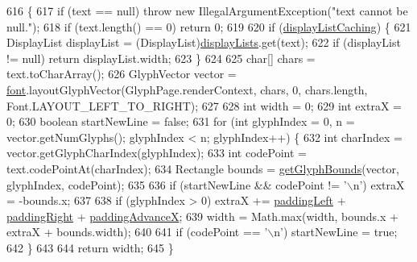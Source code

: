 \begin{DoxyCode}
616                                       \{
617         \textcolor{keywordflow}{if} (text == null) \textcolor{keywordflow}{throw} \textcolor{keyword}{new} IllegalArgumentException(\textcolor{stringliteral}{"text cannot be null."});
618         \textcolor{keywordflow}{if} (text.length() == 0) \textcolor{keywordflow}{return} 0;
619 
620         \textcolor{keywordflow}{if} (\mbox{\hyperlink{classorg_1_1newdawn_1_1slick_1_1_unicode_font_aad1040617fd0167c54d6dd3511c6bd48}{displayListCaching}}) \{
621             DisplayList displayList = (DisplayList)\mbox{\hyperlink{classorg_1_1newdawn_1_1slick_1_1_unicode_font_a66750034039374bef370150798d64f95}{displayLists}}.get(text);
622             \textcolor{keywordflow}{if} (displayList != null) \textcolor{keywordflow}{return} displayList.width;
623         \}
624 
625         \textcolor{keywordtype}{char}[] chars = text.toCharArray();
626         GlyphVector vector = \mbox{\hyperlink{classorg_1_1newdawn_1_1slick_1_1_unicode_font_a956ab491839be375d47444a67ebff11c}{font}}.layoutGlyphVector(GlyphPage.renderContext, chars, 0, chars.length, 
      Font.LAYOUT\_LEFT\_TO\_RIGHT);
627 
628         \textcolor{keywordtype}{int} width = 0;
629         \textcolor{keywordtype}{int} extraX = 0;
630         \textcolor{keywordtype}{boolean} startNewLine = \textcolor{keyword}{false};
631         \textcolor{keywordflow}{for} (\textcolor{keywordtype}{int} glyphIndex = 0, n = vector.getNumGlyphs(); glyphIndex < n; glyphIndex++) \{
632             \textcolor{keywordtype}{int} charIndex = vector.getGlyphCharIndex(glyphIndex);
633             \textcolor{keywordtype}{int} codePoint = text.codePointAt(charIndex);
634             Rectangle bounds = \mbox{\hyperlink{classorg_1_1newdawn_1_1slick_1_1_unicode_font_a61a42b9754ad2307b80a8699d484a158}{getGlyphBounds}}(vector, glyphIndex, codePoint);
635 
636             \textcolor{keywordflow}{if} (startNewLine && codePoint != \textcolor{charliteral}{'\(\backslash\)n'}) extraX = -bounds.x;
637 
638             \textcolor{keywordflow}{if} (glyphIndex > 0) extraX += \mbox{\hyperlink{classorg_1_1newdawn_1_1slick_1_1_unicode_font_a2c0919e4c3c800093767e29827064b0e}{paddingLeft}} + \mbox{\hyperlink{classorg_1_1newdawn_1_1slick_1_1_unicode_font_ac488d6ccaeeb1d846fb5fc796a4e4ff2}{paddingRight}} + 
      \mbox{\hyperlink{classorg_1_1newdawn_1_1slick_1_1_unicode_font_a347a5d8b2baa6ab7f037d5f869504883}{paddingAdvanceX}};
639             width = Math.max(width, bounds.x + extraX + bounds.width);
640 
641             \textcolor{keywordflow}{if} (codePoint == \textcolor{charliteral}{'\(\backslash\)n'}) startNewLine = \textcolor{keyword}{true};
642         \}
643 
644         \textcolor{keywordflow}{return} width;
645     \}
\end{DoxyCode}
\mbox{\label{classorg_1_1newdawn_1_1slick_1_1_unicode_font_ad81c1a98a29d8292ebb4b74f771789b5}} 
